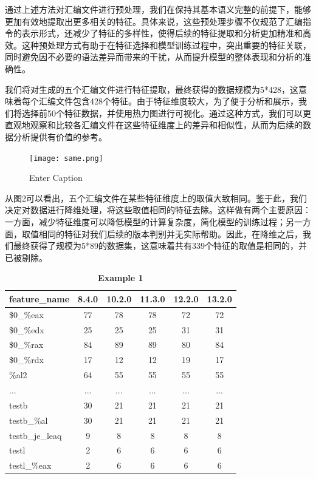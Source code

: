   通过上述方法对汇编文件进行预处理，我们在保持其基本语义完整的前提下，能够更加有效地提取出更多相关的特征。具体来说，这些预处理步骤不仅规范了汇编指令的表示形式，还减少了特征的多样性，使得后续的特征提取和分析更加精准和高效。这种预处理方式有助于在特征选择和模型训练过程中，突出重要的特征关联，同时避免因不必要的语法差异而带来的干扰，从而提升模型的整体表现和分析的准确性。

  我们将对生成的五个汇编文件进行特征提取，最终获得的数据规模为5*428，这意味着每个汇编文件包含428个特征。由于特征维度较大，为了便于分析和展示，我们将选择前50个特征数据，并使用热力图进行可视化。通过这种方式，我们可以更直观地观察和比较各汇编文件在这些特征维度上的差异和相似性，从而为后续的数据分析提供有价值的参考。
  \begin{figure}
      \centering
      \texttt{[image: same.png]}
      \caption{Enter Caption}
      \label{fig:enter-label}
  \end{figure}


从图2可以看出，五个汇编文件在某些特征维度上的取值大致相同。鉴于此，我们决定对数据进行降维处理，将这些取值相同的特征去除。这样做有两个主要原因：一方面，减少特征维度可以降低模型的计算复杂度，简化模型的训练过程；另一方面，取值相同的特征对我们后续的版本判别并无实际帮助。因此，在降维之后，我们最终获得了规模为5*89的数据集，这意味着共有339个特征的取值是相同的，并已被剔除。
\begin{table}[H]
\caption{\textbf{Example 1}}%
\centering%
\begin{tabular}{lccccc}%
\toprule%
 feature\_name&8.4.0 & 10.2.0 & 11.3.0 & 12.2.0 & 13.2.0 \\ 
\midrule%
\$0\_\%eax&77&78&78&72&72 \\
\$0\_\%edx&25 & 25 & 25 & 31 & 31 \\
\$0\_\%rax&84 & 89 & 89 & 80 & 84 \\
\$0\_\%rdx&17 & 12 & 12 & 19 & 17 \\
\%al2 & 64 & 55 & 55 & 55&55 \\
...&... & ... & ... & ... & ... \\
testb&30 & 21 & 21 & 21 & 21 \\
testb\_\%al&30 & 21 & 21 & 21 & 21 \\
testb\_je\_leaq&9 & 8 & 8 & 8 & 8 \\
testl&2 & 6 & 6 & 6 & 6 \\
testl\_\%eax&2 & 6 & 6 & 6 & 6 \\
\bottomrule%
\end{tabular}
\end{table}
   
